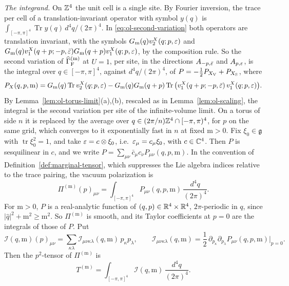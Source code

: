 \emph{The integrand.} On $\mathbb Z^4$ the unit cell is a single site. By Fourier inversion, the trace per cell of a translation-invariant operator with symbol $y(q)$ is $\int_{[-\pi,\pi]^4}\operatorname{Tr}y(q)\,d^4q/(2\pi)^4$. In \eqref{eq:ol-second-variation} both operators are translation invariant, with the symbols $G_{\mathrm m}(q)v_2^X(q;p,\varepsilon)$ and $G_{\mathrm m}(q)v_1^X(q+p;-p,\bar{\varepsilon})G_{\mathrm m}(q+p)v_1^X(q;p,\varepsilon)$, by the composition rule. So the second variation of $\widehat\Gamma^{(\mathrm m)}_{\rm F}$ at $U=1$, per site, in the directions $A_{-p,\bar{\varepsilon}}$ and $A_{p,\varepsilon}$, is the integral over $q\in[-\pi,\pi]^4$, against $d^4q/(2\pi)^4$, of $P=-\frac12P_{X_{\rm V}}+P_{X_{\rm S}}$, where
\begin{equation}\label{eq:ol-lattice-P}
P_X(q,p,\mathrm m)=G_{\mathrm m}(q)\operatorname{Tr}v_2^X(q;p,\varepsilon)-G_{\mathrm m}(q)G_{\mathrm m}(q+p)\operatorname{Tr}\big(v_1^X(q+p;-p,\bar{\varepsilon})\,v_1^X(q;p,\varepsilon)\big).
\end{equation}
By Lemma~\ref{lem:ol-torus-limit}(a),(b), rescaled as in Lemma~\ref{lem:ol-scaling}, the integral is the second variation per site of the infinite-volume limit. On a torus of side $n$ it is replaced by the average over $q\in(2\pi/n)\mathbb Z^4\cap[-\pi,\pi)^4$, for $p$ on the same grid, which converges to it exponentially fast in $n$ at fixed $\mathrm m>0$. Fix $\xi_0\in\mathfrak g$ with $\operatorname{tr}\xi_0^2=1$, and take $\varepsilon=c\otimes \xi_0$, i.e.\ $\varepsilon_\mu=c_\mu \xi_0$, with $c\in\mathbb C^4$. Then $P$ is sesquilinear in $c$, and we write $P=\sum_{\mu\nu}\bar c_\mu c_\nu P_{\mu\nu}(q,p,\mathrm m)$. In the convention of Definition~\ref{def:marginal-tensor}, which suppresses the Lie algebra indices relative to the trace pairing, the vacuum polarization is
\[
\Pi^{(\mathrm m)}(p)_{\mu\nu}=\int_{[-\pi,\pi]^4}P_{\mu\nu}(q,p,\mathrm m)\,\frac{d^4q}{(2\pi)^4}.
\]
For $\mathrm m>0$, $P$ is a real-analytic function of $(q,p)\in\mathbb R^4\times\mathbb R^4$, $2\pi$-periodic in $q$, since $|\hat q|^2+\mathrm m^2\ge\mathrm m^2$. So $\Pi^{(\mathrm m)}$ is smooth, and its Taylor coefficients at $p=0$ are the integrals of those of $P$. Put
\begin{equation}\label{eq:ol-integrand}
\mathcal I(q,\mathrm m)(p)_{\mu\nu}=\sum_{\kappa\lambda}\mathcal I_{\mu\nu\kappa\lambda}(q,\mathrm m)\,p_\kappa p_\lambda,\qquad\mathcal I_{\mu\nu\kappa\lambda}(q,\mathrm m)=\frac12\,\partial_{p_\kappa}\partial_{p_\lambda}P_{\mu\nu}(q,p,\mathrm m)\big|_{p=0}.
\end{equation}
Then the $p^2$-tensor of $\Pi^{(\mathrm m)}$ is
\[
T^{(\mathrm m)}=\int_{[-\pi,\pi]^4}\mathcal I(q,\mathrm m)\,\frac{d^4q}{(2\pi)^4}.
\]
